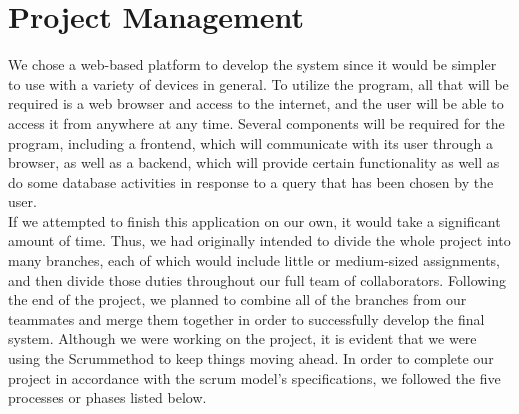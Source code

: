 \section{Project Management}\label{sec:projectmanagement}
We chose a web-based platform to develop the system since it would be simpler to use with a variety of devices in general. To utilize the program, all that will be required is a web browser and access to the internet, and the user will be able to access it from anywhere at any time. Several components will be required for the program, including a frontend, which will communicate with its user through a browser, as well as a backend, which will provide certain functionality as well as do some database activities in response to a query that has been chosen by the user.\\ 
If we attempted to finish this application on our own, it would take a significant amount of time. Thus, we had originally intended to divide the whole project into many branches, each of which would include little or medium-sized assignments, and then divide those duties throughout our full team of collaborators. Following the end of the project, we planned to combine all of the branches from our teammates and merge them together in order to successfully develop the final system. Although we were working on the project, it is evident that we were using the Scrum\footnotemark method to keep things moving ahead. In order to complete our project in accordance with the scrum model's specifications, we followed the five processes or phases listed below.

